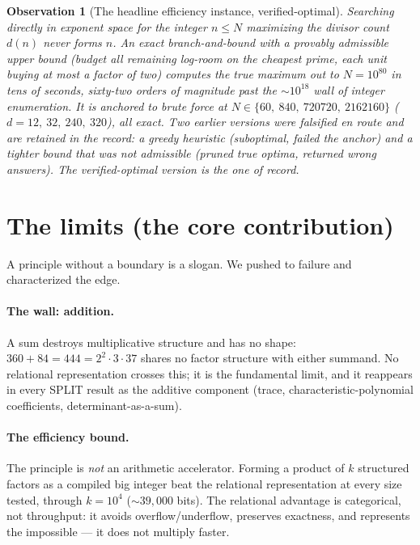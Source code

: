 \documentclass[11pt]{article}
\newtheorem{observation}{Observation}
\begin{document}
\begin{observation}[The headline efficiency instance, verified-optimal]
Searching directly in exponent space for the integer $n\le N$ maximizing the divisor count $d(n)$ never
forms $n$. An exact branch-and-bound with a \emph{provably admissible} upper bound (budget all remaining
log-room on the cheapest prime, each unit buying at most a factor of two) computes the true maximum out to
$N=10^{80}$ in tens of seconds, sixty-two orders of magnitude past the $\sim 10^{18}$ wall of integer
enumeration. It is anchored to brute force at $N \in \{60,\ 840,\ 720720,\ 2162160\}$ ($d=12,\ 32,\ 240,\ 320$), all exact.
Two earlier versions were \emph{falsified} en route and are retained in the record: a greedy heuristic
(suboptimal, failed the anchor) and a tighter bound that was not admissible (pruned true optima, returned
wrong answers). The verified-optimal version is the one of record.
\end{observation}

\section{The limits (the core contribution)}

A principle without a boundary is a slogan. We pushed to failure and characterized the edge.

\paragraph{The wall: addition.} A sum destroys multiplicative structure and has no shape: $360+84=444=
2^2\cdot 3\cdot 37$ shares no factor structure with either summand. No relational representation crosses
this; it is the fundamental limit, and it reappears in every SPLIT result as the additive component
(trace, characteristic-polynomial coefficients, determinant-as-a-sum).

\paragraph{The efficiency bound.} The principle is \emph{not} an arithmetic accelerator. Forming a product of
$k$ structured factors as a compiled big integer beat the relational representation at every size tested,
through $k=10^4$ ($\sim 39{,}000$ bits). The relational advantage is categorical, not throughput: it avoids
overflow/underflow, preserves exactness, and represents the impossible --- it does not multiply faster.
\end{document}
